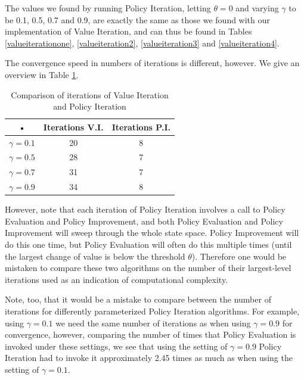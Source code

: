 \documentclass{article}
\begin{document}
The values we found by running Policy Iteration, letting $\theta = 0$ and varying $\gamma$ to be 0.1, 0.5, 0.7 and 0.9, are exactly the same as those we found with our implementation of Value Iteration, and can thus be found in Tables \ref{valueiterationone}, \ref{valueiteration2}, \ref{valueiteration3} and \ref{valueiteration4}.

The convergence speed in numbers of iterations is different, however. We give an overview in Table \ref{tab:policyEvaluationValues}.

\begin{table}[htb]
\centering
\begin{tabular}{|c|c|c|}
\hline 
• & Iterations V.I. & Iterations P.I. \\ 
\hline 
$\gamma = 0.1 $ & 20 & 8 \\ 
\hline 
$\gamma = 0.5 $ & 28 & 7 \\ 
\hline 
$\gamma = 0.7 $  & 31 & 7 \\ 
\hline 
$\gamma = 0.9 $ & 34 & 8 \\ 
\hline 
\end{tabular}
\caption{Comparison of iterations of Value Iteration and Policy Iteration}
\label{tab:policyEvaluationValues} 
\end{table}

However, note that each iteration of Policy Iteration involves a call to Policy Evaluation and Policy Improvement, and both Policy Evaluation and Policy Improvement will sweep through the whole state space. Policy Improvement will do this one time, but Policy Evaluation will often do this multiple times (until the largest change of value is below the threshold $\theta$). Therefore one would be mistaken to compare these two algorithms on the number of their largest-level iterations used as an indication of computational complexity. 

Note, too, that it would be a mistake to compare between the number of iterations for differently parameterized Policy Iteration algorithms. For example, using  $\gamma = 0.1 $ we need the same number of iterations as when using $\gamma = 0.9 $  for convergence, however, comparing the number of times that Policy Evaluation is invoked under these settings, we see that using the setting of $\gamma = 0.9 $ Policy Iteration had to invoke it approximately 2.45 times as much as when using the setting of $\gamma = 0.1 $. 

\newpage
\appendix
\appendixpage
\end{document}
